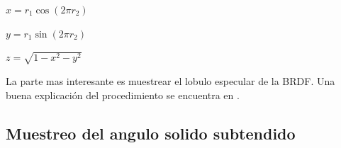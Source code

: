 \smallskip

$x = r_1 \cos (2\pi r_2)$

\smallskip

$y = r_1 \sin (2\pi r_2)$

\smallskip

$z = \sqrt{1 - x^2 - y^2}$

\medskip

La parte mas interesante es muestrear el lobulo especular de la BRDF. Una buena explicación del procedimiento se encuentra en \cite{Lafortune1994}.


\subsection{Muestreo del angulo solido subtendido}

